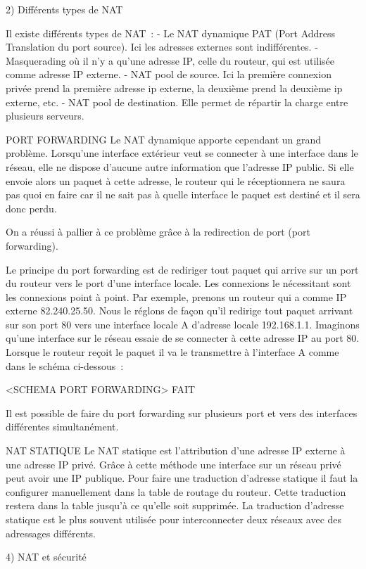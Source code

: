 2) Différents types de NAT

Il existe différents types de NAT : 
- Le NAT dynamique PAT (Port Address Translation du port source). Ici les
adresses externes sont indifférentes.
- Masquerading où il n'y a qu'une adresse IP, celle du routeur, qui est
utilisée comme adresse IP externe.
- NAT pool de source. Ici la première connexion privée prend la première
adresse ip externe, la deuxième prend la deuxième ip externe, etc.
- NAT pool de destination. Elle permet de répartir la charge entre plusieurs
serveurs.

PORT FORWARDING
Le NAT dynamique apporte cependant un grand problème. Lorsqu'une interface
extérieur veut se connecter à une interface dans le réseau, elle ne dispose
d'aucune autre information que l'adresse IP public. Si elle envoie alors un
paquet à cette adresse, le routeur qui le réceptionnera ne saura pas quoi en
faire car il ne sait pas à quelle interface le paquet est destiné et il sera
donc perdu. 

On a réussi à pallier à ce problème grâce à la redirection de port (port 
forwarding). 

Le principe du port forwarding est de rediriger tout paquet qui arrive sur un
port du routeur vers le port d'une interface locale. Les connexions le
nécessitant sont les connexions point à point.
Par exemple, prenons un routeur qui a comme IP externe 82.240.25.50.
Nous le réglons de façon qu'il redirige tout paquet arrivant sur son port 80
vers une interface locale A d'adresse locale 192.168.1.1.
Imaginons qu'une interface sur le réseau essaie de se connecter à cette adresse
 IP au port 80.
Lorsque le routeur reçoit le paquet il va le transmettre à l'interface A comme
dans le schéma ci-dessous :

<SCHEMA PORT FORWARDING> FAIT

Il est possible de faire du port forwarding sur plusieurs port et vers des
interfaces différentes simultanément.

NAT STATIQUE
Le NAT statique est l'attribution d'une adresse IP externe à une adresse IP 
privé. Grâce à cette méthode une interface sur un réseau privé peut avoir une
IP publique. Pour faire une traduction d'adresse statique il faut la configurer
manuellement dans la table de routage du routeur. Cette traduction restera dans
la table jusqu'à ce qu'elle soit supprimée. La traduction d'adresse statique
est le plus souvent utilisée pour interconnecter deux réseaux avec des
adressages différents.

4) NAT et sécurité

